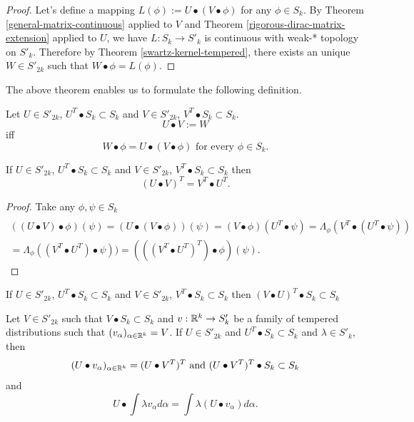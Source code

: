 \documentclass[main.tex]{subfiles}
\begin{document}
\begin{proof}
Let's define a mapping $L(\phi):= U \bullet (V \bullet \phi)$ for any $\phi\in S_k$. By Theorem \ref{general-matrix-continuous} applied to $V$ and Theorem \ref{rigorous-dirac-matrix-extension} applied to $U$, we have $L: S_k\to S'_k$ is continuous with weak-* topology on $S'_k$. Therefore by Theorem \ref{swartz-kernel-tempered}, there exists an unique $W\in S'_{2k}$ such that $W\bullet \phi = L(\phi)$.
\end{proof}
The above theorem enables us to formulate the following definition.
\begin{definition}
Let $U\in S'_{2k}$, $U^T\bullet S_k \subset S_k$ and $V\in S'_{2k}$, $V^T\bullet S_k \subset S_k$.
\begin{equation}
U \bullet V := W
\end{equation}
iff
\begin{equation}
W \bullet \phi = U \bullet (V \bullet \phi) \text{ for every } \phi\in S_k. 
\end{equation}
\end{definition}
\begin{theorem}
\label{general-matrix-transopsition-law}
If $U\in S'_{2k}$, $U^T\bullet S_k \subset S_k$ and $V\in S'_{2k}$, $V^T\bullet S_k \subset S_k$ then
\begin{equation}
(U\bullet V)^T = V^T \bullet U^T.
\end{equation}
\end{theorem}
\begin{proof}
Take any $\phi, \psi\in S_k$
\begin{multline}
\\
((U\bullet V)\bullet \phi)(\psi) = (U \bullet (V \bullet \phi)) (\psi) = (V \bullet \phi)(U^T \bullet \psi) = \Lambda_\phi(V^T\bullet(U^T \bullet \psi))\\
= \Lambda_\phi((V^T\bullet U^T) \bullet \psi)) = (((V^T\bullet U^T)^T)\bullet \phi)(\psi).
\end{multline}
\end{proof}
\begin{corollary}
If $U\in S'_{2k}$, $U^T\bullet S_k \subset S_k$ and $V\in S'_{2k}$, $V^T\bullet S_k \subset S_k$ then $(V\bullet U)^T \bullet S_k \subset S_k$ 
\end{corollary}
\begin{theorem}
\label{distribution-integral-distribution-param-operator}
Let $V\in S'_{2k}$ such that $V \bullet S_k \subset S_k$ and $v:\mathbb{R}^k \to S'_k$ be a family of tempered distributions such that $(v_\alpha)_{\alpha\in \mathbb{R}^k} = V$. If  $U\in S'_{2k}$ and $U^T\bullet S_k \subset S_k$ and $\lambda\in S'_k$, then
\begin{equation}
(U\bullet v_\alpha)_{\alpha\in\mathbb{R}^k} = (U \bullet V^T)^T \text{ and }
(U \bullet V^T)^T \bullet S_k \subset S_k
\end{equation}
and
\begin{equation}
U \bullet \int \lambda v_\alpha d\alpha = \int \lambda (U\bullet v_\alpha) d\alpha.
\end{equation}
\end{theorem}
\end{document}
